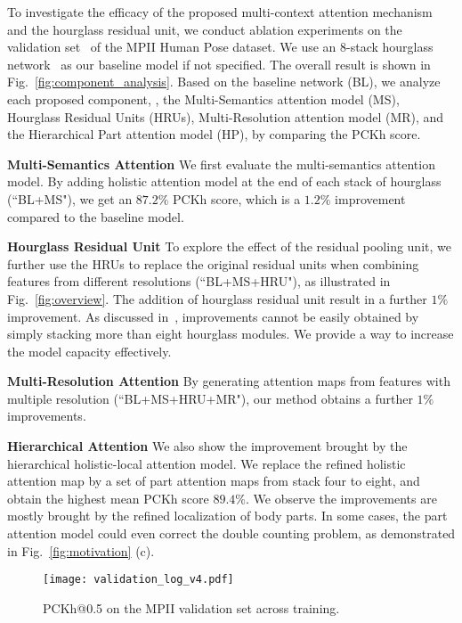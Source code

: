 \documentclass[10pt,twocolumn,letterpaper]{article}
\newcommand{\smalltitle}[1]{\vspace{0.2em}\noindent \textbf{{#1}}}
\begin{document}
To investigate the efficacy of the proposed multi-context attention mechanism and the hourglass residual unit, we conduct ablation experiments on the validation set~\cite{tompson2015efficient} of the MPII Human Pose dataset. We use an 8-stack hourglass network~\cite{newell2016stacked} as our baseline model if not specified. 
The overall result is shown in Fig.~\ref{fig:component_analysis}. 
Based on the baseline network (BL), we analyze each proposed component, \ie, the Multi-Semantics attention model (MS), Hourglass Residual Units (HRUs), Multi-Resolution attention model (MR), and the Hierarchical Part attention model (HP), by comparing the PCKh score. 

\smalltitle{Multi-Semantics Attention} 
We first evaluate the multi-semantics attention model. By adding holistic attention model at the end of each stack of hourglass (``BL+MS"), we get an $87.2\%$ PCKh score, which is a $1.2\%$ improvement compared to the baseline model. 

\smalltitle{Hourglass Residual Unit} 
To explore the effect of the residual pooling unit, we further use the HRUs to replace the original residual units when combining features from different resolutions (``BL+MS+HRU"), as illustrated in Fig.~\ref{fig:overview}. The addition of hourglass residual unit result in a further $1\%$ improvement. 
As discussed in~\cite{newell2016stacked}, improvements cannot be easily obtained by simply stacking more than eight hourglass modules. 
We provide a way to increase the model capacity effectively.  


\smalltitle{Multi-Resolution Attention} 
By generating attention maps from features with multiple resolution (``BL+MS+HRU+MR"), our method obtains a further $1\% $ improvements.   


\smalltitle{Hierarchical Attention} 
We also show the improvement brought by the hierarchical holistic-local attention model. We replace the refined holistic attention map by a set of part attention maps from stack four to eight, and obtain the highest mean PCKh score $89.4\%$. 
We observe the improvements are mostly brought by the refined localization of body parts. 
In some cases, the part attention model could even correct the double counting problem, as demonstrated in Fig.~\ref{fig:motivation} (c).

\begin{figure} \begin{center}
    \texttt{[image: validation\_log\_v4.pdf]}
  \end{center}
  \vspace{-2em}
  \caption{\small PCKh@0.5 on the MPII validation set across training.}
    \vspace{-1.5em}
  \label{fig:valid_acc}
\end{figure}
\end{document}

